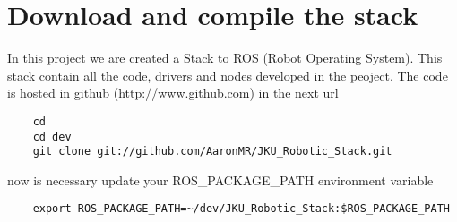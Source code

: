 \chapter{Download and compile the stack}

In this project we are created a Stack to ROS (Robot Operating System). This stack contain all the code, drivers and nodes developed in the peoject.
The code is hosted in github (http://www.github.com) in the next url


\begin{verbatim}
    cd
    cd dev
    git clone git://github.com/AaronMR/JKU_Robotic_Stack.git
\end{verbatim}


now is necessary update your ROS\_PACKAGE\_PATH environment variable

\begin{verbatim}
    export ROS_PACKAGE_PATH=~/dev/JKU_Robotic_Stack:$ROS_PACKAGE_PATH
\end{verbatim}

